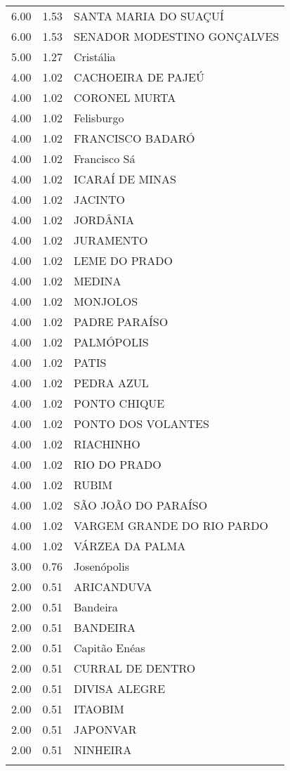 \documentclass[a4paper, 12pt, openright, oneside, english, brazil, article]{abntex2}
\begin{document}
\begin{scriptsize}
\begin{longtable}{rrl}
			6.00 & 1.53 & SANTA MARIA DO SUAÇUÍ \\ 
			6.00 & 1.53 & SENADOR MODESTINO GONÇALVES \\ 
			5.00 & 1.27 & Cristália \\ 
			4.00 & 1.02 & CACHOEIRA DE PAJEÚ \\ 
			4.00 & 1.02 & CORONEL MURTA \\ 
			4.00 & 1.02 & Felisburgo \\ 
			4.00 & 1.02 & FRANCISCO BADARÓ \\ 
			4.00 & 1.02 & Francisco Sá \\ 
			4.00 & 1.02 & ICARAÍ DE MINAS \\ 
			4.00 & 1.02 & JACINTO \\ 
			4.00 & 1.02 & JORDÂNIA \\ 
			4.00 & 1.02 & JURAMENTO \\ 
			4.00 & 1.02 & LEME DO PRADO \\ 
			4.00 & 1.02 & MEDINA \\ 
			4.00 & 1.02 & MONJOLOS \\ 
			4.00 & 1.02 & PADRE PARAÍSO \\ 
			4.00 & 1.02 & PALMÓPOLIS \\ 
			4.00 & 1.02 & PATIS \\ 
			4.00 & 1.02 & PEDRA AZUL \\ 
			4.00 & 1.02 & PONTO CHIQUE \\ 
			4.00 & 1.02 & PONTO DOS VOLANTES \\ 
			4.00 & 1.02 & RIACHINHO \\ 
			4.00 & 1.02 & RIO DO PRADO \\ 
			4.00 & 1.02 & RUBIM \\ 
			4.00 & 1.02 & SÃO JOÃO DO PARAÍSO \\ 
			4.00 & 1.02 & VARGEM GRANDE DO RIO PARDO \\ 
			4.00 & 1.02 & VÁRZEA DA PALMA \\ 
			3.00 & 0.76 & Josenópolis \\ 
			2.00 & 0.51 & ARICANDUVA \\ 
			2.00 & 0.51 & Bandeira \\ 
			2.00 & 0.51 & BANDEIRA \\ 
			2.00 & 0.51 & Capitão Enéas \\ 
			2.00 & 0.51 & CURRAL DE DENTRO \\ 
			2.00 & 0.51 & DIVISA ALEGRE \\ 
			2.00 & 0.51 & ITAOBIM \\ 
			2.00 & 0.51 & JAPONVAR \\ 
			2.00 & 0.51 & NINHEIRA \\ 
			\hline
			\hline
			\label{motivo4}
		\end{longtable}
	\end{scriptsize}
\end{document}
